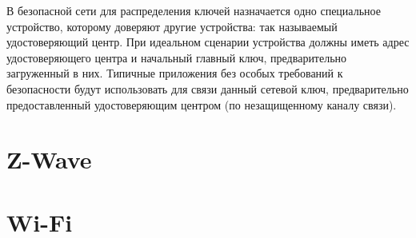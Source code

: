 	В безопасной сети для распределения ключей назначается одно специальное устройство, которому доверяют 
	другие устройства: так называемый удостоверяющий центр. При идеальном сценарии устройства должны 
	иметь адрес удостоверяющего центра и начальный главный ключ, предварительно загруженный в них. 
	Типичные приложения без особых требований к безопасности будут использовать для связи данный сетевой ключ, 
	предварительно предоставленный удостоверяющим центром (по незащищенному каналу связи).

	
	\section{Z-Wave}
	
	
	\section{Wi-Fi}